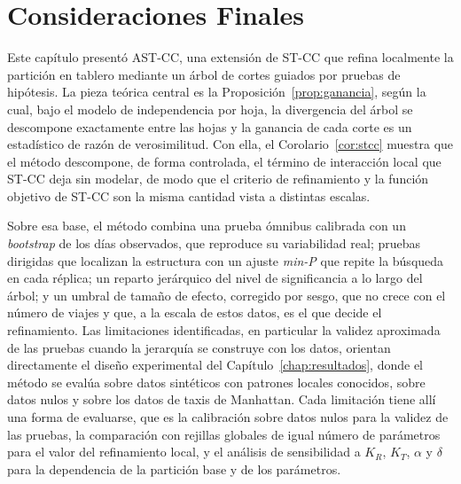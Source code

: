 \section{Consideraciones Finales}\label{sec:prop-final}

Este capítulo presentó AST-CC, una extensión de ST-CC que refina localmente la
partición en tablero mediante un árbol de cortes guiados por pruebas de
hipótesis. La pieza teórica central es la
Proposición~\ref{prop:ganancia}, según la cual, bajo el modelo de independencia por hoja, la
divergencia del árbol se descompone exactamente entre las hojas y la ganancia de
cada corte es un estadístico de razón de verosimilitud. Con ella, el
Corolario~\ref{cor:stcc} muestra que el método descompone, de forma controlada,
el término de interacción local que ST-CC deja sin modelar, de modo que el
criterio de refinamiento y la función objetivo de ST-CC son la misma cantidad
vista a distintas escalas.

Sobre esa base, el método combina una prueba ómnibus calibrada con un \emph{bootstrap}
de los días observados, que reproduce su variabilidad real; pruebas dirigidas
que localizan la estructura con un ajuste \emph{min-P} que repite la búsqueda en cada
réplica; un reparto jerárquico del nivel de significancia a lo largo del árbol;
y un umbral de tamaño de efecto, corregido por sesgo, que no crece con el número
de viajes y que, a la escala de estos datos, es el que decide el refinamiento.
Las limitaciones identificadas, en particular la validez aproximada de las
pruebas cuando la jerarquía se construye con los datos, orientan directamente
el diseño experimental del Capítulo~\ref{chap:resultados}, donde el método se
evalúa sobre datos sintéticos con patrones locales conocidos, sobre datos nulos
y sobre los datos de taxis de Manhattan. Cada limitación tiene allí una forma de
evaluarse, que es la calibración sobre datos nulos para la validez de las pruebas,
la comparación con rejillas globales de igual número de parámetros para el valor del
refinamiento local, y el análisis de sensibilidad a $K_R$, $K_T$, $\alpha$ y
$\delta$ para la dependencia de la partición base y de los parámetros.

